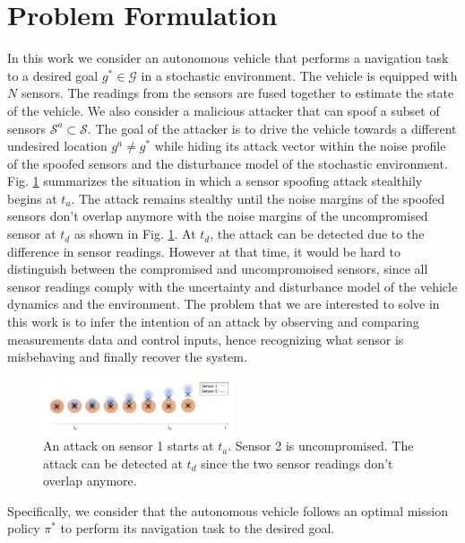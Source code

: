\documentclass[letterpaper, 10 pt, conference]{ieeeconf}  %
\begin{document}
\section{Problem Formulation}\label{sec:problem}
In this work we consider an autonomous vehicle that performs a navigation task to a desired goal $g^* \in \mathcal G$ in a stochastic environment. The vehicle is equipped with $N$ sensors. The readings from the sensors are fused together to estimate the state of the vehicle. We also consider a malicious attacker that can spoof a subset of sensors $\mathcal{S}^a \subset \mathcal{S}$. The goal of the attacker is to drive the vehicle towards a different undesired location $g^a \neq g^*$ while hiding its attack vector within the noise profile of the spoofed sensors and the disturbance model of the stochastic environment.  Fig. \ref{fig:sensor_spoofing} summarizes the situation in which a sensor spoofing attack stealthily begins at $t_a$. The attack remains stealthy until the noise margins of the spoofed sensors don't overlap anymore with the noise margins of the uncompromised sensor at $t_d$ as shown in Fig. \ref{fig:sensor_spoofing}. At $t_d$, the attack can be detected due to the difference in sensor readings. However at that time, it would be hard to distinguish between the compromised and uncompromoised sensors, since all sensor readings comply with the uncertainty and disturbance model of the vehicle dynamics and the environment. The problem that we are interested to solve in this work is to infer the intention of an attack by observing and comparing measurements data and control inputs, hence recognizing what sensor is misbehaving and finally recover the system. 
\begin{figure}[h]
\centering
\includegraphics[width=0.5\textwidth]{sensor_spoofing}
\caption{An attack on sensor 1 starts at $t_a$. Sensor 2 is uncompromised. The attack can be detected at $t_d$ since the two sensor readings don't overlap anymore.}
 \label{fig:sensor_spoofing}
\end{figure}
Specifically, we consider that the autonomous vehicle follows an optimal mission policy $\pi^*$ to perform its navigation task to the desired goal. 
\end{document}

